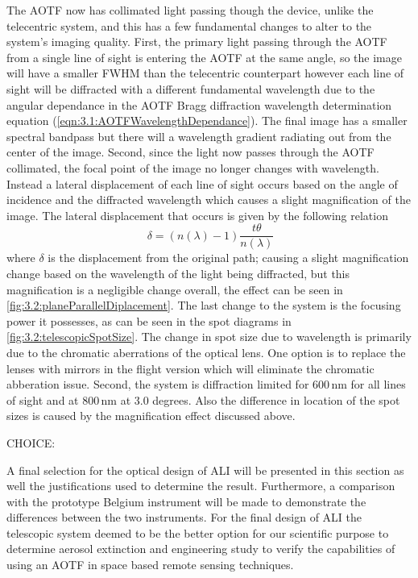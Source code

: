 \documentclass[12pt, draft]{article}
\begin{document}
The AOTF now has collimated light passing though the device, unlike the telecentric system, and this has a few fundamental changes to alter to the system's imaging quality. First, the primary light passing through the AOTF from a single line of sight is entering the AOTF at the same angle, so the image will have a smaller FWHM than the telecentric counterpart however each line of sight will be diffracted with a different fundamental wavelength due to the angular dependance in the AOTF Bragg diffraction wavelength determination equation (\autoref{eqn:3.1:AOTFWavelengthDependance}). The final image has a smaller spectral bandpass but there will a wavelength gradient radiating out from the center of the image. Second, since the light now passes through the AOTF collimated, the focal point of the image no longer changes with wavelength. Instead a lateral displacement of each line of sight occurs based on the angle of incidence and the diffracted wavelength which causes a slight magnification of the image. The lateral displacement that occurs is given by the following relation
\begin{equation}
    \ \delta = (n(\lambda)-1)\frac{t\theta}{n(\lambda)}
    \label{eqn:3.2:planeParallelDiplacement}
\end{equation}
where $\delta$ is the displacement from the original path; causing a slight magnification change based on the wavelength of the light being diffracted, but this magnification is a negligible change overall, the effect can be seen in \autoref{fig:3.2:planeParallelDiplacement}. The last change to the system is the focusing power it possesses, as can be seen in the spot diagrams in \autoref{fig:3.2:telescopicSpotSize}. The change in spot size due to wavelength is primarily due to the chromatic aberrations of the optical lens. One option is to replace the lenses with mirrors in the flight version which will eliminate the chromatic abberation issue. Second, the system is diffraction limited for 600\,nm for all lines of sight and at 800\,nm at 3.0 degrees. Also the difference in location of the spot sizes is caused by the magnification effect discussed above.

CHOICE:

A final selection for the optical design of ALI will be presented in this section as well the justifications used to determine the result. Furthermore, a comparison with the prototype Belgium instrument will be made to demonstrate the differences between the two instruments. For the final design of ALI the telescopic system deemed to be the better option for our scientific purpose to determine aerosol extinction and engineering study to verify the capabilities of using an AOTF in space based remote sensing techniques.
\end{document}
